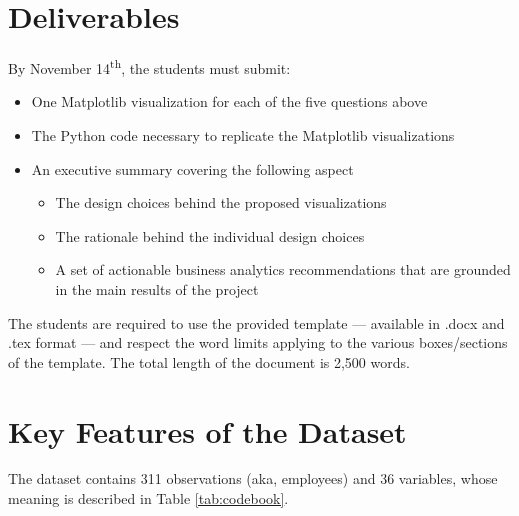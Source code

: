 \documentclass[11pt]{article}
\begin{document}
\section{Deliverables}

By November 14\textsuperscript{th}, the students must submit:
\begin{itemize}
	\item
	One Matplotlib visualization for each of the five questions above 
	\item 
	The Python code necessary to replicate the Matplotlib visualizations
	\item  
	An executive summary covering the following aspect
	\begin{itemize}
		\item 
		The design choices behind the proposed visualizations
		\item 
		The rationale behind the individual design choices
		\item 
		A set of actionable business analytics recommendations that are
		grounded in the main results of the project
	\end{itemize}
\end{itemize}

The students are required to use the provided template --- available in .docx
and .tex format --- and respect the word limits applying to the various
boxes/sections of the template. The total length of the document is 2,500 words.

\section{Key Features of the Dataset}

The dataset contains 311 observations (aka, employees) and 36 variables, whose 
meaning is described in Table \ref{tab:codebook}.
\end{document}

